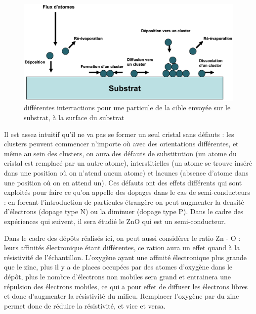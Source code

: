 \documentclass[a4paper,12pt,oneside]{article}
\begin{document}
\begin{figure}[h!]
	\begin{center}
	\includegraphics[width=1.\linewidth,angle=0]{./figures/illustration_depot2.png}
	\caption{différentes interractions pour une particule de la cible envoyée sur le substrat, à la surface du substrat} \label{fig:illustration_depot2}
	\end{center}
\end{figure}

Il est assez intuitif qu'il ne va pas se former un seul cristal sans défauts : les clusters peuvent commencer n'importe où avec des orientations différentes, et même au sein des clusters, on aura des défauts de substitution (un atome du cristal est remplacé par un autre atome), interstitielles (un atome se trouve inséré dans une position où on n'atend aucun atome) et lacunes (absence d'atome dans une position où on en attend un). Ces défauts ont des effets différents qui sont exploités pour faire ce qu'on appelle des dopages dans le cas de semi-conducteurs : en forcant l'introduction de particules étrangère on peut augmenter la densité d'électrons (dopage type N) ou la diminuer (dopage type P). Dans le cadre des expériences qui suivent, il sera étudié le ZnO qui est un semi-conducteur.


Dans le cadre des dépôts réalisés ici, on peut aussi considérer le ratio Zn - O : leurs affinités électronique étant différentes, ce ration aura un effet quand à la résistivité de l'échantillon. L'oxygène ayant une affinité électronique plus grande que le zinc, plus il y a de places occupées par des atomes d'oxygène dans le dépôt, plus le nombre d'électrons non mobiles sera grand et entrainera une répulsion des électrons mobiles, ce qui a pour effet de diffuser les électrons libres et donc d'augmenter la résistivité du milieu. Remplacer l'oxygène par du zinc permet donc de réduire la résistivité, et vice et versa.
\end{document}
